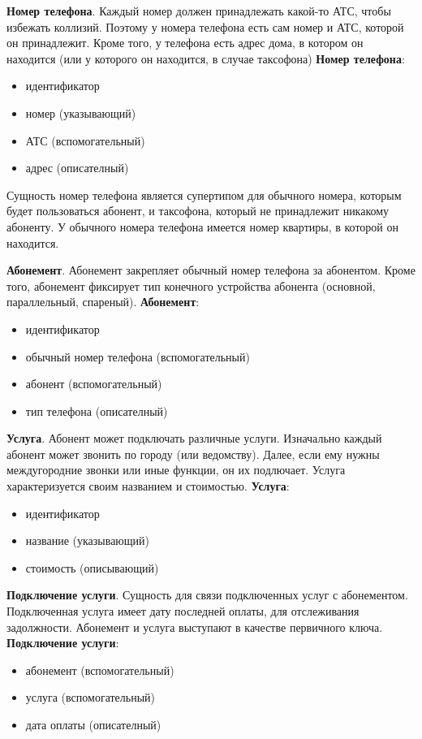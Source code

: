 \documentclass{report}
\begin{document}
\textbf{Номер телефона}. Каждый номер должен принадлежать какой-то АТС, 
чтобы избежать коллизий. Поэтому у номера телефона есть сам номер
и АТС, которой он принадлежит. Кроме того, у телефона есть адрес дома,
в котором он находится (или у которого он находится, в случае таксофона)
\newline\textbf{Номер телефона}:
\begin{itemize}
    \item идентификатор
    \item номер (указывающий)
    \item АТС (вспомогательный)
    \item адрес (описателный)
\end{itemize}
Сущность номер телефона является супертипом для обычного номера, 
которым будет пользоваться абонент, и таксофона, который не принадлежит
никакому абоненту. У обычного номера телефона имеется номер квартиры, 
в которой он находится. 

\textbf{Абонемент}. Абонемент закрепляет обычный номер телефона за абонентом.
Кроме того, абонемент фиксирует тип конечного 
устройства абонента (основной, параллельный, спареный). 
\newline\textbf{Абонемент}:
\begin{itemize}
    \item идентификатор
    \item обычный номер телефона (вспомогательный)
    \item абонент (вспомогательный)
    \item тип телефона (описателный)
\end{itemize}

\textbf{Услуга}. Абонент может подключать различные услуги. Изначально 
каждый абонент может звонить по городу (или ведомству). Далее, если 
ему нужны междугородние звонки или иные функции, он их подлючает. Услуга
характеризуется своим названием и стоимостью.
\newline\textbf{Услуга}:
\begin{itemize}
    \item идентификатор
    \item название (указывающий)
    \item стоимость (описывающий)
\end{itemize}

\textbf{Подключение услуги}. Сущность для связи подключенных услуг с 
абонементом. Подключенная услуга имеет дату последней оплаты, для отслеживания
задолжности. Абонемент и услуга выступают в качестве первичного ключа.
\newline\textbf{Подключение услуги}:
\begin{itemize}
    \item абонемент (вспомогательный)
    \item услуга (вспомогательный)
    \item дата оплаты (описателный)
\end{itemize}
\end{document}
